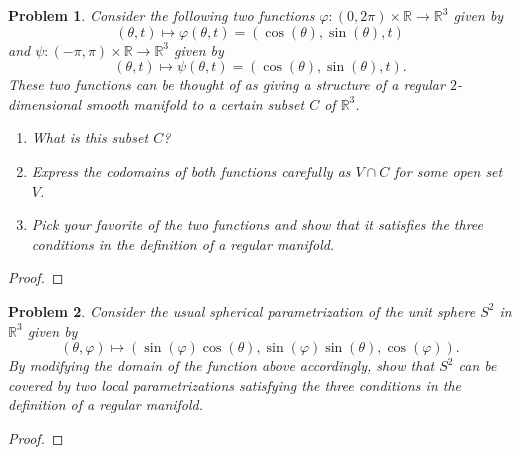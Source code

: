 \documentclass[reqno]{amsart}
\theoremstyle{plain}
\newtheorem{problem}{Problem}
\theoremstyle{definition}
\begin{document}
\begin{problem}
Consider the following two functions $\varphi:(0,2\pi) \times \mathbb{R} \rightarrow \mathbb{R}^{3}$ given by 
$$(\theta,t) \mapsto \varphi(\theta,t) = (\cos(\theta),\sin(\theta),t) $$
and $\psi:(-\pi,\pi) \times \mathbb{R} \rightarrow \mathbb{R}^{3}$ given by
$$(\theta,t) \mapsto \psi(\theta,t) = (\cos(\theta),\sin(\theta),t). $$
These two functions can be thought of as giving a structure of a regular $2$-dimensional smooth manifold to a certain subset $C$ of $\mathbb{R}^{3}$.
\begin{enumerate}
\item What is this subset $C$?
\item Express the codomains of both functions carefully as $V \cap C$ for some open set $V$.
\item Pick your favorite of the two functions and show that it satisfies the three conditions in the definition of a regular manifold.
\end{enumerate}
\end{problem}
\begin{proof}

\end{proof}


\begin{problem}
Consider the usual spherical parametrization of the unit sphere $S^{2}$ in $\mathbb{R}^{3}$ given by
$$(\theta,\varphi) \mapsto (\sin(\varphi) \cos(\theta), \sin(\varphi) \sin(\theta), \cos(\varphi)). $$
By modifying the domain of the function above accordingly, show that $S^{2}$ can be covered by two local parametrizations satisfying the three conditions in the definition of a regular manifold.
\end{problem}
\begin{proof}

\end{proof}
\end{document}
